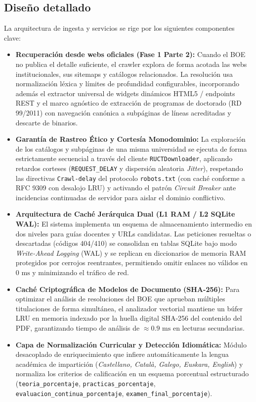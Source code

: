 \subsection{Diseño detallado}
La arquitectura de ingesta y servicios se rige por los siguientes componentes clave:
\begin{itemize}
    \item \textbf{Recuperación desde webs oficiales (Fase 1 Parte 2):} Cuando el BOE no publica el detalle suficiente, el crawler explora de forma acotada las webs institucionales, sus sitemaps y catálogos relacionados. La resolución usa normalización léxica y límites de profundidad configurables, incorporando además el extractor universal de widgets dinámicos HTML5 / endpoints REST y el marco agnóstico de extracción de programas de doctorado (RD 99/2011) con navegación canónica a subpáginas de líneas acreditadas y descarte de binarios.
    \item \textbf{Garantía de Rastreo Ético y Cortesía Monodominio:} La exploración de los catálogos y subpáginas de una misma universidad se ejecuta de forma estrictamente secuencial a través del cliente \texttt{RUCTDownloader}, aplicando retardos corteses (\texttt{REQUEST\_DELAY} y dispersión aleatoria \emph{Jitter}), respetando las directivas \texttt{Crawl-delay} del protocolo \texttt{robots.txt} (con caché conforme a RFC 9309 con desalojo LRU) y activando el patrón \emph{Circuit Breaker} ante incidencias continuadas de servidor para aislar el dominio conflictivo.
    \item \textbf{Arquitectura de Caché Jerárquica Dual (L1 RAM / L2 SQLite WAL):} El sistema implementa un esquema de almacenamiento intermedio en dos niveles para guías docentes y URLs candidatas. Las peticiones resueltas o descartadas (códigos 404/410) se consolidan en tablas SQLite bajo modo \emph{Write-Ahead Logging} (WAL) y se replican en diccionarios de memoria RAM protegidos por cerrojos reentrantes, permitiendo omitir enlaces no válidos en $0\text{ ms}$ y minimizando el tráfico de red.
    \item \textbf{Caché Criptográfica de Modelos de Documento (SHA-256):} Para optimizar el análisis de resoluciones del BOE que aprueban múltiples titulaciones de forma simultánea, el analizador vectorial mantiene un búfer LRU en memoria indexado por la huella digital SHA-256 del contenido del PDF, garantizando tiempo de análisis de $\approx 0.9\text{ ms}$ en lecturas secundarias.
    \item \textbf{Capa de Normalización Curricular y Detección Idiomática:} Módulo desacoplado de enriquecimiento que infiere automáticamente la lengua académica de impartición (\emph{Castellano, Català, Galego, Euskara, English}) y normaliza los criterios de calificación en un esquema porcentual estructurado (\texttt{teoria\_porcentaje}, \texttt{practicas\_porcentaje}, \texttt{evaluacion\_continua\_porcentaje}, \texttt{examen\_final\_porcentaje}).

\end{itemize}
